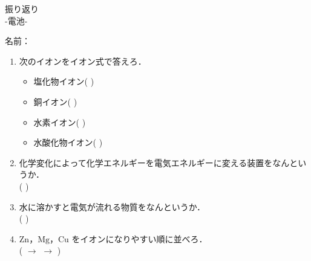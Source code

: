 \documentclass[fontsize=15pt]{jlreq}
\begin{document}
\begin{center}
{\LARGE {振り返り}} \\
-電池- %
\end{center}
\vspace{1em}
\begin{flushright}
名前：\underline{\hspace{5cm}}
\end{flushright}

\begin{enumerate}
    \item 次のイオンをイオン式で答えろ．
    \begin{itemize}
        \item 塩化物イオン\hspace{1.4em}( \hspace{2cm} )
        \item 銅イオン\hspace{3.4em}( \hspace{2cm} )
        \item 水素イオン\hspace{2.4em}( \hspace{2cm} )
        \item 水酸化物イオン\hspace{0.4em}( \hspace{2cm} )
    \end{itemize}
    \vspace{2em} 

    \item 化学変化によって化学エネルギーを電気エネルギーに変える装置をなんというか．\\
    ( \hspace{3cm} )
    \vspace{2em} 

    \item 水に溶かすと電気が流れる物質をなんというか．\\
    ( \hspace{3cm} )
    \vspace{2em} 

    \item $\mathrm{Zn}$，$\mathrm{Mg}$，$\mathrm{Cu}$ をイオンになりやすい順に並べろ．\\
    ( \hspace{2cm}$\rightarrow$ \hspace{2cm} $\rightarrow$\hspace{2cm} )
    \vspace{2em} 


\end{enumerate}
\end{document}
